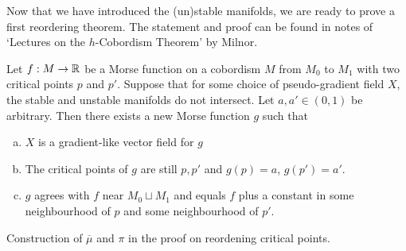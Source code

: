 Now that we have introduced the (un)stable manifolds, we are ready to prove a first reordering theorem. The statement and proof can be found in notes of `Lectures on the $h$-Cobordism Theorem' by Milnor.
\begin{theorem}
    Let $f: M \to  \mathbb{R}$ be a Morse function on a cobordism $M$ from $M_0$ to $M_1$ with two critical points $p$ and  $p'$.
    Suppose that for some choice of pseudo-gradient field $X$, the stable and unstable manifolds do not intersect.
    Let $a, a' \in (0,1)$ be arbitrary.
    Then there exists a new Morse function $g$ such that
    \begin{enumerate}[(a)]
        \item $X$ is a gradient-like vector field for  $g$
        \item The critical points of  $g$ are still $p, p'$ and $g(p) = a$,  $g(p') = a'$.
        \item $g$ agrees with  $f$ near $M_0 \sqcup M_1$ and equals $f$ plus a constant in some neighbourhood of  $p$ and some neighbourhood of  $p'$.
    \end{enumerate}
    \label{thm:reordening}
\end{theorem}
\begin{marginfigure}
    \centering
    \caption{
        Construction of $\overline{\mu}$ and $\pi$ in the proof on reordening critical points.
    }
    \label{fig:reordening-theorem-milnor-h-cobordism}
\end{marginfigure}
